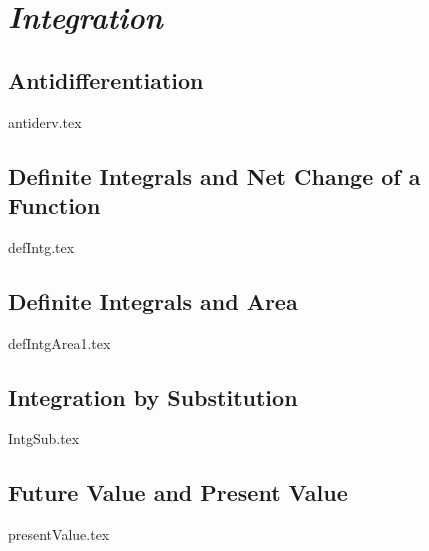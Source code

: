 \documentclass[11pt,a4paper,oneside]{book}
\theoremstyle{definition}%
\begin{document}
\part{\emph{Integration}}

\chapter{Antidifferentiation}\label{antiderv}
{antiderv.tex}

\chapter{Definite Integrals and Net Change of a Function}\label{defIntg}
{defIntg.tex}

\chapter{Definite Integrals and Area}\label{defIntgArea}
{defIntgArea1.tex}

\chapter{Integration by Substitution}\label{IntgSub}
{IntgSub.tex}

\chapter{Future Value and Present Value}\label{presentValue}
{presentValue.tex}



\end{document}
